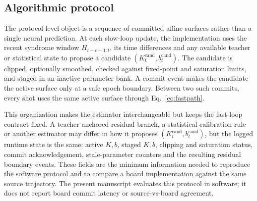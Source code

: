 \documentclass[11pt]{article}
\begin{document}
\subsection{Algorithmic protocol}

The protocol-level object is a sequence of committed affine surfaces rather
than a single neural prediction.  At each slow-loop update, the implementation
uses the recent syndrome window \(H_{t-c+1:t}\), its time differences and any
available teacher or statistical state to propose a candidate
\((K_t^{\mathrm{cand}},b_t^{\mathrm{cand}})\).  The candidate is clipped,
optionally smoothed, checked against fixed-point and saturation limits, and
staged in an inactive parameter bank.  A commit event makes the candidate the
active surface only at a safe epoch boundary.  Between two such commits, every
shot uses the same active surface through Eq.~\eqref{eq:fastpath}.

This organization makes the estimator interchangeable but keeps the fast-loop
contract fixed.  A teacher-anchored residual branch, a statistical calibration
rule or another estimator may differ in how it proposes
\((K_t^{\mathrm{cand}},b_t^{\mathrm{cand}})\), but the logged runtime state is
the same: active \(K,b\), staged \(K,b\), clipping and saturation status,
commit acknowledgement, stale-parameter counters and the resulting residual
boundary events.  These fields are the minimum information needed to reproduce
the software protocol and to compare a board implementation against the
same source trajectory.  The present manuscript evaluates this protocol in
software; it does not report board commit latency or source-vs-board agreement.
\end{document}

